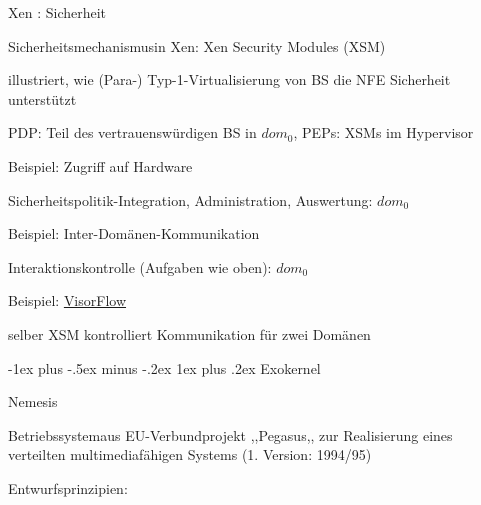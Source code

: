\documentclass[a4paper]{article}
\makeatletter
\renewcommand{\subsubsection}{\@startsection{subsubsection}{3}{0mm}%
 {-1ex plus -.5ex minus -.2ex}%
 {1ex plus .2ex}%
 {\normalfont\small\bfseries}}
\makeatother
\begin{document}
\begin{multicols}{3}
    Xen : Sicherheit

    \begin{itemize*}
        \item Sicherheitsmechanismusin Xen: Xen Security Modules (XSM)
        \item illustriert, wie (Para-) Typ-1-Virtualisierung von BS die NFE
        Sicherheit unterstützt
        \item PDP: Teil des vertrauenswürdigen BS in $dom_0$, PEPs: XSMs im
        Hypervisor
        \item Beispiel: Zugriff auf Hardware
        \begin{itemize*}
            \item Sicherheitspolitik-Integration, Administration, Auswertung: $dom_0$
        \end{itemize*}
        \item Beispiel: Inter-Domänen-Kommunikation
        \begin{itemize*}
            \item Interaktionskontrolle (Aufgaben wie oben): $dom_0$
            \item Beispiel: \href{https://www.flyn.org/projects/VisorFlow/}{VisorFlow}
            \item selber XSM kontrolliert Kommunikation für zwei Domänen
        \end{itemize*}
    \end{itemize*}


    \subsubsection{Exokernel}

    Nemesis

    \begin{itemize*}
        \item Betriebssystemaus EU-Verbundprojekt ,,Pegasus,, zur Realisierung eines
        verteilten multimediafähigen Systems (1. Version: 1994/95)
        \item Entwurfsprinzipien:
        \begin{enumerate*}


\end{enumerate*}
\end{itemize*}
\end{multicols}
\end{document}
